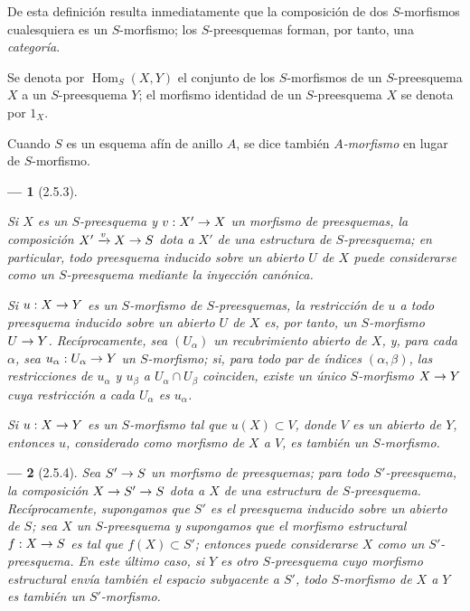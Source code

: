 \documentclass[oneside]{amsart}
\theoremstyle{ega-env-style}
\newtheorem*{env}{---}
\theoremstyle{ega-thm-env-style}
\theoremstyle{ega-defn-env-style}
\renewcommand{\to}{\mathchoice{\longrightarrow}{\rightarrow}{\rightarrow}{\rightarrow}}
\newcommand{\oldpage}[2][]{{\marginnote{\normalfont{\textbf{#1}~|~#2}}}\ignorespaces}
\let\EGAOriginalLabel\label
\renewcommand{\label}[1]{\phantomsection\EGAOriginalLabel{#1}}
\begin{document}
De esta definición resulta inmediatamente que la composición de dos $S$-morfismos cualesquiera es un $S$-morfismo;
los $S$-preesquemas forman, por tanto, una \emph{categoría}.

Se denota por $\operatorname{Hom}_S(X,Y)$ el conjunto de los $S$-morfismos de un $S$-preesquema $X$ a un $S$-preesquema $Y$;
el morfismo identidad de un $S$-preesquema $X$ se denota por $1_X$.

Cuando $S$ es un esquema afín de anillo $A$, se dice también \emph{$A$-morfismo} en lugar de $S$-morfismo.


\oldpage[I]{104}
\begin{env}[2.5.3]
\label{I.2.5.3}

Si $X$ es un $S$-preesquema y $v:X'\to X$ un morfismo de preesquemas, la composición $X'\xrightarrow{v}X\to S$ dota a $X'$ de una estructura de $S$-preesquema;
en particular, todo preesquema inducido sobre un abierto $U$ de $X$ puede considerarse como un $S$-preesquema mediante la inyección canónica.

Si $u:X\to Y$ es un $S$-morfismo de $S$-preesquemas, la restricción de $u$ a todo preesquema inducido sobre un abierto $U$ de $X$ es, por tanto, un $S$-morfismo $U\to Y$.
Recíprocamente, sea $(U_\alpha)$ un recubrimiento abierto de $X$, y, para cada $\alpha$, sea $u_\alpha:U_\alpha\to Y$ un $S$-morfismo;
si, para todo par de índices $(\alpha,\beta)$, las restricciones de $u_\alpha$ y $u_\beta$ a $U_\alpha\cap U_\beta$ coinciden, existe un único $S$-morfismo $X\to Y$ cuya restricción a cada $U_\alpha$ es $u_\alpha$.

Si $u:X\to Y$ es un $S$-morfismo tal que $u(X)\subset V$, donde $V$ es un abierto de $Y$, entonces $u$, considerado como morfismo de $X$ a $V$, es también un $S$-morfismo.
\end{env}

\begin{env}[2.5.4]
\label{I.2.5.4}
Sea $S'\to S$ un morfismo de preesquemas;
para todo $S'$-preesquema, la composición $X\to S'\to S$ dota a $X$ de una estructura de $S$-preesquema.
Recíprocamente, supongamos que $S'$ es el preesquema inducido sobre un abierto de $S$;
sea $X$ un $S$-preesquema y supongamos que el morfismo estructural $f:X\to S$ es tal que $f(X)\subset S'$;
entonces puede considerarse $X$ como un $S'$-preesquema.
En este último caso, si $Y$ es otro $S$-preesquema cuyo morfismo estructural envía también el espacio subyacente a $S'$, todo $S$-morfismo de $X$ a $Y$ es también un $S'$-morfismo.
\end{env}
\end{document}
